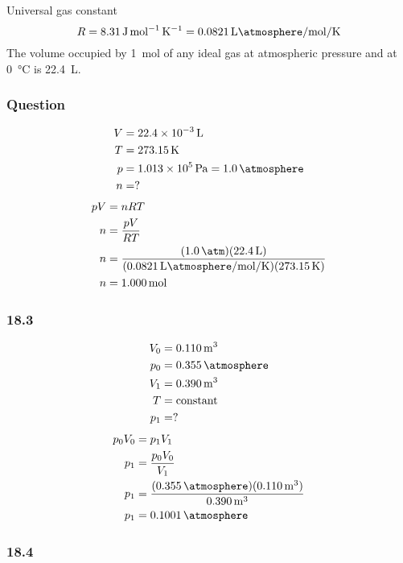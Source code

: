 \documentclass{article}
\begin{document}
Universal gas constant
\begin{equation}
	R = \SI{8.31}{\joule \per \mole \per \kelvin} = \SI{0.0821}{\liter \atmosphere \per \mole \per \kelvin}
\end{equation}
The volume occupied by \SI{1}{\mole} of any ideal gas at atmospheric pressure and at \SI{0}{\celsius} is \SI{22.4}{\liter}.

\subsubsection{Question}

\begin{align*}
	V & = \SI{22.4e-3}{\liter} \\
	T & = \SI{273.15}{\kelvin} \\
	p & = \SI{1.013e5}{\pascal} = \SI{1.0}{\atmosphere} \\
	n & = ?
\end{align*}
\begin{align*}
	pV & = nRT \\
	n & = \frac{ pV }{ RT } \\
	n & = \frac{ (\SI{1.0}{\atm})(\SI{22.4}{\liter}) }{ (\SI{0.0821}{\liter \atmosphere \per \mole \per \kelvin})(\SI{273.15}{\kelvin}) } \\
	n & = \SI{1.000}{\mole}
\end{align*}

\subsubsection{18.3}

\begin{align*}
	V_0 & = \SI{0.110}{\meter \cubed} \\
	p_0 & = \SI{0.355}{\atmosphere} \\
	V_1 & = \SI{0.390}{\meter \cubed} \\
	T & = \text{constant} \\
	p_1 & = ?
\end{align*}
\begin{align*}
	p_0V_0 & = p_1V_1 \\
	p_1 & = \frac{ p_0V_0 }{ V_1 } \\
	p_1 & = \frac{ (\SI{0.355}{\atmosphere})(\SI{0.110}{\meter \cubed}) }{ \SI{0.390}{\meter \cubed} } \\
	p_1 & = \SI{0.1001}{\atmosphere}
\end{align*}

\subsubsection{18.4}
\end{document}
